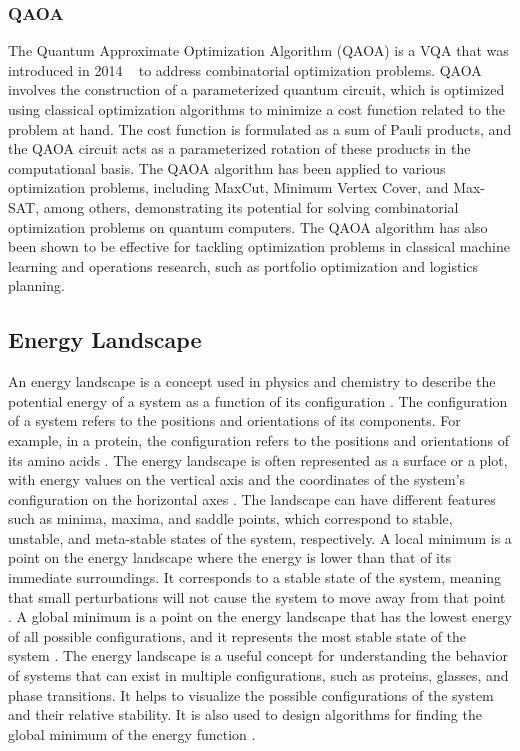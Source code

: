\subsubsection{QAOA}
The Quantum Approximate Optimization Algorithm (QAOA) is a VQA that was introduced in 2014 ~\cite{farhi2014quantum} to address combinatorial optimization problems.
QAOA involves the construction of a parameterized quantum circuit, which is optimized using
classical optimization algorithms to minimize a cost function related to the problem at hand.
The cost function is formulated as a sum of Pauli products, and the QAOA circuit acts as a parameterized
rotation of these products in the computational basis. The QAOA algorithm has been applied to various
optimization problems, including MaxCut, Minimum Vertex Cover, and Max-SAT, among others, demonstrating
its potential for solving combinatorial optimization problems on quantum computers.
The QAOA algorithm has also been shown to be effective for tackling optimization problems in classical
machine learning and operations research, such as portfolio optimization and logistics planning.


\subsection{Energy Landscape}\label{subsec:energy-landscape}
An energy landscape is a concept used in physics and chemistry to describe the potential energy of a system as a function
of its configuration \cite{wales2003energy}. The configuration of a system refers to the positions and orientations of
its components. For example, in a protein, the configuration refers to the positions and orientations of its amino
acids \cite{dill2012protein}. The energy landscape is often represented as a surface or a plot, with energy values on
the vertical axis and the coordinates of the system's configuration on the horizontal axes \cite{wales2003energy}.
The landscape can have different features such as minima, maxima, and saddle points, which correspond to stable,
unstable, and meta-stable states of the system, respectively. A local minimum is a point on the energy landscape where
the energy is lower than that of its immediate surroundings. It corresponds to a stable state of the system,
meaning that small perturbations will not cause the system to move away from that point \cite{wales2003energy}.
A global minimum is a point on the energy landscape that has the lowest energy of all possible configurations,
and it represents the most stable state of the system \cite{wales2003energy}. The energy landscape is a useful concept
for understanding the behavior of systems that can exist in multiple configurations, such as proteins, glasses,
and phase transitions. It helps to visualize the possible configurations of the system and their relative stability.
It is also used to design algorithms for finding the global minimum of the energy function \cite{wales1997global}.

